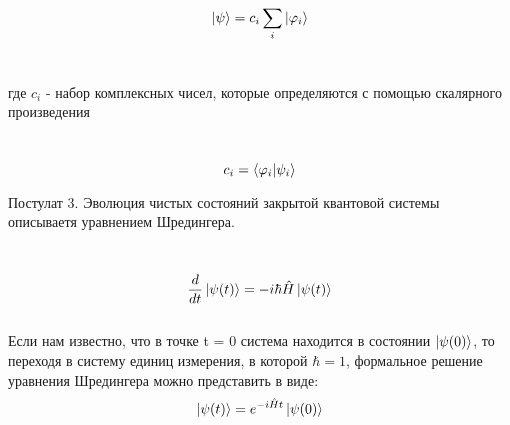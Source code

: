 \documentclass[a4paper, 10pt]{article}
\begin{document}
        \begin{equation}
            \ket{\psi}= c_i \sum_i \ket{\varphi_i}
        \end{equation}
        \\ 
        \begin{itshape}
            где $c_i$ - набор комплексных чисел, которые определяются с помощью скалярного произведения
        \end{itshape}
        \\

        \begin{equation}
            c_i = \bra{\varphi_i} \ket{\psi_i}
        \end{equation}

        
        \begin{itshape}
            Постулат 3. Эволюция чистых состояний закрытой квантовой системы описываетя уравнением Шредингера.
        \end{itshape}
        \\

        \begin{equation}
            \frac{d}{dt} \ket{\psi(t)} = -i \hbar \hat{H} \ket{\psi(t)}
        \end{equation}
        \\

        Если нам известно, что в точке t = 0 система находится в состоянии $\ket{\psi(0)}$, то переходя в систему единиц измерения, в которой $\hbar = 1$, формальное решение уравнения Шредингера можно представить в виде:
        \\
        \begin{equation}
            \ket{\psi(t)} = e^{-i\hat{H}t} \ket{\psi(0)}
        \end{equation}
\end{document}
